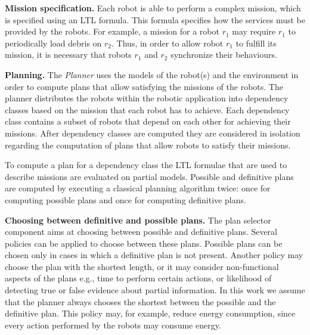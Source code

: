 \textbf{Mission specification.}
Each robot is able to perform a complex mission, which is specified using an LTL formula.
This formula specifies how the services must be provided by the robots.
For example, a mission for a robot $r_1$ may require $r_1$ to  periodically load debris on $r_2$.
Thus, in order to allow robot $r_1$ to fulfill its mission, it is necessary that robots $r_1$ and $r_2$ synchronize their behaviours.





\textbf{Planning.} 
The \emph{Planner} uses the models of the robot(s) and the environment in order to compute plans that allow satisfying the missions of the robots.
The planner distributes the robots within the robotic application into dependency classes based on the mission that each robot has to achieve.
Each dependency class contains a subset of robots that depend on each other for achieving their missions.
After  dependency classes are computed they are considered in isolation regarding the computation of plans that allow robots to satisfy their missions.

To compute a plan for a dependency class the  LTL formulae that are used to describe missions are evaluated on partial models.
Possible and definitive plans are computed by executing a classical planning algorithm twice: once for computing possible plans and once for computing definitive plans.



\textbf{Choosing between definitive and possible plans.}
The plan selector component aims at choosing between possible and definitive plans.
Several policies can be applied to choose between these plans.
Possible plans can be chosen only in cases in which a definitive plan is  not present.
Another policy may choose the plan with the shortest length, or it may consider non-functional aspects of the plans e.g., time to perform certain actions, or likelihood of detecting true or false evidence about partial information. 
In this work we assume  that the planner always chooses the shortest between the possible and the definitive plan.
This policy may, for example, reduce energy consumption, since every action performed by the robots may consume energy. 

